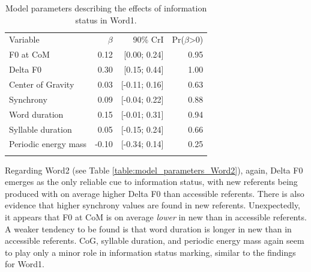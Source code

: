 \begin{table}[]
\begin{tabular}{lrrr}
\lsptoprule
\multicolumn{4}{c}{Word1} \\ \hline
Variable    & $\beta$ & 90\% CrI  & Pr($\beta$\textgreater{}0) \\ \hline
F0 at CoM    & 0.12       & {[}0.00; 0.24{]}  & 0.95                          \\
Delta F0    & 0.30       & {[}0.15; 0.44{]}  & 1.00                          \\
Center of Gravity            & 0.03       & {[}-0.11; 0.16{]}  & 0.63                          \\
Synchrony            & 0.09       & {[}-0.04; 0.22{]}  & 0.88                          \\
Word duration            & 0.15       & {[}-0.01; 0.31{]}  & 0.94                          \\
Syllable duration & 0.05       & {[}-0.15; 0.24{]}  & 0.66                             \\
Periodic energy mass         & -0.10       & {[}-0.34; 0.14{]} & 0.25                          \\
\lspbottomrule
\end{tabular}
\caption{Model parameters describing the effects of information status in Word1.}
\label{table:model_parameters_Word1}
\end{table}

Regarding Word2 (see Table \ref{table:model_parameters_Word2}), again, Delta F0 emerges as the only reliable cue to information status, with new referents being produced with on average higher Delta F0 than accessible referents. There is also evidence that higher synchrony values are found in new referents. Unexpectedly, it appears that F0 at CoM is on average \textit{lower} in new than in accessible referents. A weaker tendency to be found is that word duration is longer in new than in accessible referents. CoG, syllable duration, and periodic energy mass again seem to play only a minor role in information status marking, similar to the findings for Word1.

